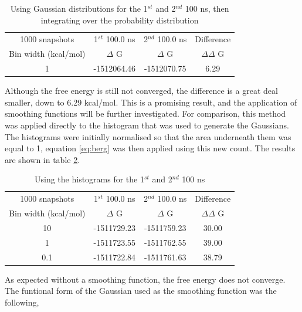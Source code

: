 \begin{table}[ht]
 \caption{Using Gaussian distributions for the 1$^{st}$ and 2$^{nd}$ 100 ns, then integrating over the probability distribution}
  \begin{center}
  \begin{tabular}{c|c|c|c}
   \hline\hline
 1000 snapshots & 1$^{st}$ 100.0 ns & 2$^{nd}$ 100.0 ns & Difference \\
 Bin width (kcal/mol) & $\Delta$ G & $\Delta$ G & $\Delta \Delta$ G  \\
\hline
1 & -1512064.46 & -1512070.75 & 6.29 \\
  \end{tabular}\label{table:ethanol_using_gaussian}
 \end{center}
\end{table}

Although the free energy is still not converged, the difference is a great deal smaller, down to 6.29 kcal/mol.  This is a promising result, and the application of smoothing functions will be further investigated.  For comparison, this method was applied directly to the histogram that was used to generate the Gaussians.  The histograms were initially normalised so that the area underneath them was equal to 1, equation \ref{eq:berg} was then applied using this new count.  The results are shown in table \ref{table:ethanol_using_histogram}.

\begin{table}[ht]
 \caption{Using the histograms for the 1$^{st}$ and 2$^{nd}$ 100 ns}
  \begin{center}
  \begin{tabular}{c|c|c|c}
   \hline\hline
 1000 snapshots & 1$^{st}$ 100.0 ns & 2$^{nd}$ 100.0 ns & Difference \\
 Bin width (kcal/mol) & $\Delta$ G & $\Delta$ G & $\Delta \Delta$ G  \\
\hline
10 & -1511729.23 & -1511759.23 & 30.00 \\
\hline
1 & -1511723.55 & -1511762.55 & 39.00 \\
\hline
0.1 & -1511722.84 & -1511761.63 & 38.79 \\
  \end{tabular}\label{table:ethanol_using_histogram}
 \end{center}
\end{table}

As expected without a smoothing function, the free energy does not converge.  The funtional form of the Gaussian used as the smoothing function was the following,

